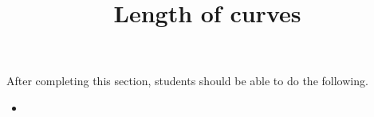 \documentclass{ximera}
\title{Length of curves}
\begin{document}
\begin{abstract}
\end{abstract}

\maketitle

\begin{sectionOutcomes}

After completing this section, students should be able to do the following.

\begin{itemize}
\item 
\end{itemize}

\end{sectionOutcomes}
\end{document}

